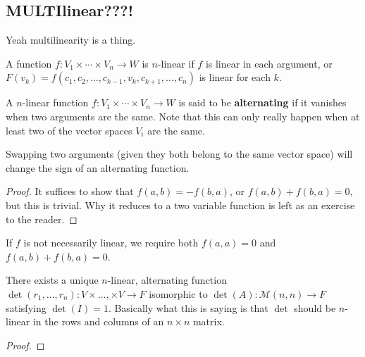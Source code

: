 \subsection{MULTIlinear???!}
Yeah multilinearity is a thing.

\begin{df}
A function $f : V_1 \times \cdots \times V_n \rightarrow W$ is
$n$-linear if $f$ is linear in each argument, or $F(v_k) = f(c_1, c_2,
\dots, c_{k - 1}, v_k, c_{k + 1}, \dots, c_n)$ is linear for each $k$.
\end{df}

\begin{df}
A $n$-linear function $f : V_1 \times \cdots \times V_n \rightarrow W$
is said to be \textbf{alternating} if it vanishes when two arguments are
the same.  Note that this can only really happen when at least two of
the vector spaces $V_i$ are the same.
\end{df}

\begin{prop}
Swapping two arguments (given they both belong to the same vector space)
will change the sign of an alternating function.
\end{prop}

\begin{proof}
It suffices to show that $f(a, b) = -f(b, a)$, or $f(a, b) + f(b, a) =
0$, but this is trivial. Why it reduces to a two variable function is
left as an exercise to the reader.
\end{proof}

\begin{rem}
If $f$ is not necessarily linear, we require both $f(a, a) = 0$ and
$f(a, b) + f(b, a) = 0$.
\end{rem}

\begin{thm}
There exists a unique $n$-linear, alternating function $\det(r_1, \dots,
r_n) : V \times \dots, \times V \rightarrow F$ isomorphic to $\det(A) :
\mathcal{M}(n, n) \rightarrow F$ satisfying $\det(I) = 1$. Basically
what this is saying is that $\det$ should be $n$-linear in the rows and
columns of an $n \times n$ matrix.
\end{thm}

\begin{proof}
\end{proof}
